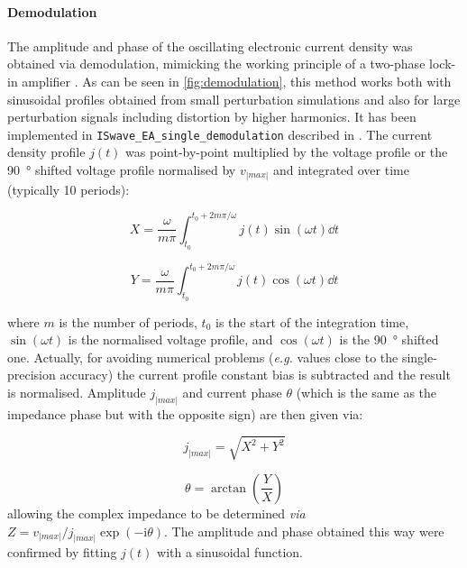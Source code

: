 	\paragraph{Demodulation}
	The amplitude and phase of the oscillating electronic current density was obtained via
	demodulation, mimicking the working principle of a two-phase lock-in amplifier \cite{WikipediaLockIn}.
	As can be seen in \cref{fig:demodulation}, this method works both with sinusoidal profiles obtained from small perturbation simulations and also for large perturbation signals including distortion by higher harmonics.
	It has been implemented in \texttt{IS\-wave\_EA\_single\_demodulation} described in .
	The current density profile $j(t)$ was point-by-point multiplied by the voltage profile or the \SI{90}{\degree} shifted
	voltage profile normalised by $v_|max|$ and integrated over time (typically 10 periods):

	\begin{equation}
		X = \frac{\omega}{m \pi} \int_{t_0}^{t_0+2m\pi / \omega} j(t) \sin(\omega t) \dd t
	\end{equation}

	\begin{equation}
		Y = \frac{\omega}{m \pi} \int_{t_0}^{t_0+2m\pi / \omega} j(t) \cos(\omega t) \dd t
	\end{equation}

	where $m$ is the number of periods, $t_0$ is the start of the integration time, $\sin(\omega t)$ is the normalised voltage profile, and $\cos(\omega t)$ is the \SI{90}{\degree} shifted one.
	Actually, for avoiding numerical problems (\textsl{e.g.} values close to the single\hyp{}precision accuracy) the current profile constant bias is subtracted and the result is normalised.
	Amplitude $j_|max|$ and current phase $\theta$ (which is the same as the impedance phase but with the opposite sign) are then given via:

	\begin{equation}
		j_|max| = \sqrt{X^2 + Y^2}
	\end{equation}

	\begin{equation}
		\theta = \arctan(\frac{Y}{X})
	\end{equation}
	allowing the complex impedance to be determined \textsl{via} $Z = v_|max| / j_|max| \exp(-\mathrm{i}\theta)$.
	The amplitude and phase	obtained this way were confirmed by fitting $j(t)$ with a sinusoidal function.
	
